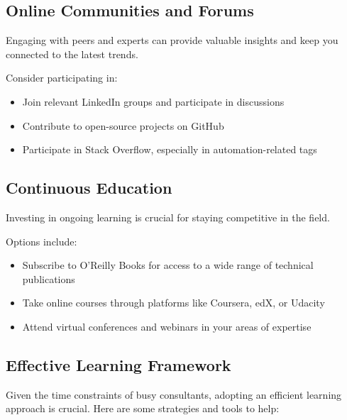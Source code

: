 \subsection{Online Communities and Forums}

Engaging with peers and experts can provide valuable insights and keep you connected to the latest trends.

Consider participating in:

\begin{itemize}
    \item Join relevant LinkedIn groups and participate in discussions
    \item Contribute to open-source projects on GitHub
    \item Participate in Stack Overflow, especially in automation-related tags
\end{itemize}
%
\subsection{Continuous Education}

Investing in ongoing learning is crucial for staying competitive in the field.

Options include:

\begin{itemize}
    \item Subscribe to O'Reilly Books for access to a wide range of technical publications
    \item Take online courses through platforms like Coursera, edX, or Udacity
    \item Attend virtual conferences and webinars in your areas of expertise
\end{itemize}

\subsection{Effective Learning Framework}

Given the time constraints of busy consultants, adopting an efficient learning approach is crucial. Here are some strategies and tools to help:

